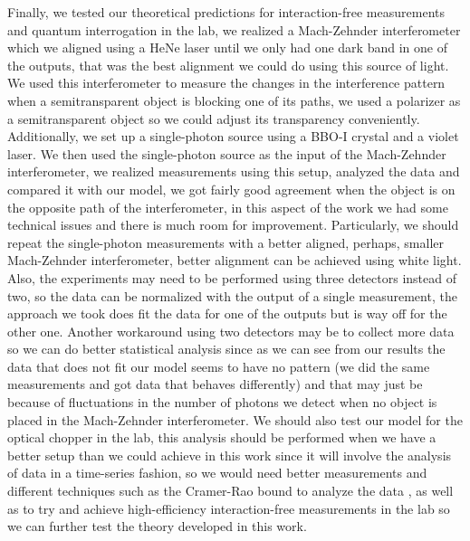\documentclass[12pt]{book}
\begin{document}
Finally, we tested our theoretical predictions for interaction-free measurements and quantum interrogation in the lab, we realized a Mach-Zehnder interferometer which we aligned using a HeNe laser until we only had one dark band in one of the outputs, that was the best alignment we could do using this source of light. We used this interferometer to measure the changes in the interference pattern when a semitransparent object is blocking one of its paths, we used a polarizer as a semitransparent object so we could adjust its transparency conveniently. Additionally, we set up a single-photon source using a BBO-I crystal and a violet laser. We then used the single-photon source as the input of the Mach-Zehnder interferometer, we realized measurements using this setup, analyzed the data and compared it with our model, we got fairly good agreement when the object is on the opposite path of the interferometer, in this aspect of the work we had some technical issues and there is much room for improvement. Particularly, we should repeat the single-photon measurements with a better aligned, perhaps, smaller Mach-Zehnder interferometer, better alignment can be achieved using white light. Also, the experiments may need to be performed using three detectors instead of two, so the data can be normalized with the output of a single measurement, the approach we took does fit the data for one of the outputs but is way off for the other one. Another workaround using two detectors may be to collect more data so we can do better statistical analysis since as we can see from our results the data that does not fit our model seems to have no pattern (we did the same measurements and got data that behaves differently) and that may just be because of fluctuations in the number of photons we detect when no object is placed in the Mach-Zehnder interferometer. We should also test our model for the optical chopper in the lab, this analysis should be performed when we have a better setup than we could achieve in this work since it will involve the analysis of data in a time-series fashion, so we would need better measurements and different techniques such as the Cramer-Rao bound to analyze the data \cite{Ferrie}, as well as to try and achieve high-efficiency interaction-free measurements in the lab so we can further test the theory developed in this work.  


\pagebreak
{}


\end{document}
